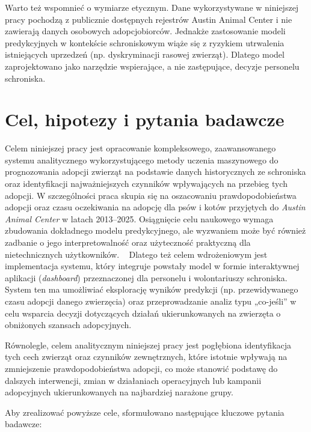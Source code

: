 Warto też wspomnieć o wymiarze etycznym. Dane wykorzystywane w niniejszej pracy pochodzą z publicznie dostępnych rejestrów Austin Animal Center i nie zawierają danych osobowych adopcjobiorców. Jednakże zastosowanie modeli predykcyjnych w kontekście schroniskowym wiąże się z ryzykiem utrwalenia istniejących uprzedzeń (np. dyskryminacji rasowej zwierząt). Dlatego model zaprojektowano jako narzędzie wspierające, a nie zastępujące, decyzje personelu schroniska.

\section{Cel, hipotezy i pytania badawcze}\label{sec:cel-hipotezy}

Celem niniejszej pracy jest opracowanie kompleksowego, zaawansowanego systemu analitycznego wykorzystującego metody uczenia maszynowego do prognozowania adopcji zwierząt na podstawie danych historycznych ze schroniska oraz identyfikacji najważniejszych czynników wpływających na przebieg tych adopcji. W szczególności praca skupia się na oszacowaniu prawdopodobieństwa adopcji oraz czasu oczekiwania na adopcję dla psów i kotów przyjętych do \emph{Austin Animal Center} w latach 2013–2025. Osiągnięcie celu naukowego wymaga zbudowania dokładnego modelu predykcyjnego, ale wyzwaniem może być również zadbanie o jego interpretowalność oraz użyteczność praktyczną dla nietechnicznych użytkowników.   Dlatego też celem wdrożeniowym jest implementacja systemu, który integruje powstały model w formie interaktywnej aplikacji (\emph{dashboard}) przeznaczonej dla personelu i wolontariuszy schroniska. System ten ma umożliwiać eksplorację wyników predykcji (np. przewidywanego czasu adopcji danego zwierzęcia) oraz przeprowadzanie analiz typu „co-jeśli” w celu wsparcia decyzji dotyczących działań ukierunkowanych na zwierzęta o obniżonych szansach adopcyjnych.

Równolegle, celem analitycznym niniejszej pracy jest pogłębiona identyfikacja tych cech zwierząt oraz czynników zewnętrznych, które istotnie wpływają na zmniejszenie prawdopodobieństwa adopcji, co może stanowić podstawę do dalszych interwencji, zmian w działaniach operacyjnych lub kampanii adopcyjnych ukierunkowanych na najbardziej narażone grupy.

Aby zrealizować powyższe cele, sformułowano następujące kluczowe pytania badawcze:

